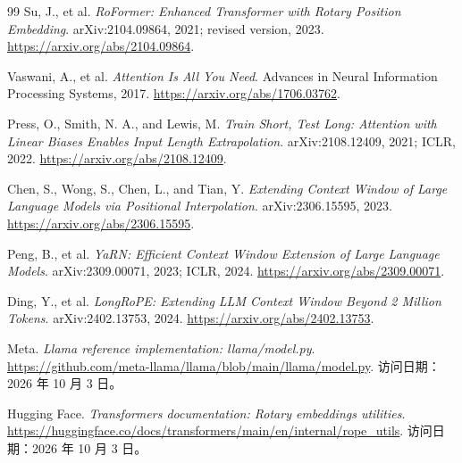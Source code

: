 \documentclass[UTF8,12pt,a4paper,fontset=fandol]{ctexart}
\begin{document}
\begin{thebibliography}{99}
Su, J., et al.
\textit{RoFormer: Enhanced Transformer with Rotary Position Embedding}.
arXiv:2104.09864, 2021; revised version, 2023.
\url{https://arxiv.org/abs/2104.09864}.

Vaswani, A., et al.
\textit{Attention Is All You Need}.
Advances in Neural Information Processing Systems, 2017.
\url{https://arxiv.org/abs/1706.03762}.

Press, O., Smith, N. A., and Lewis, M.
\textit{Train Short, Test Long: Attention with Linear Biases Enables Input Length Extrapolation}.
arXiv:2108.12409, 2021; ICLR, 2022.
\url{https://arxiv.org/abs/2108.12409}.

Chen, S., Wong, S., Chen, L., and Tian, Y.
\textit{Extending Context Window of Large Language Models via Positional Interpolation}.
arXiv:2306.15595, 2023.
\url{https://arxiv.org/abs/2306.15595}.

Peng, B., et al.
\textit{YaRN: Efficient Context Window Extension of Large Language Models}.
arXiv:2309.00071, 2023; ICLR, 2024.
\url{https://arxiv.org/abs/2309.00071}.

Ding, Y., et al.
\textit{LongRoPE: Extending LLM Context Window Beyond 2 Million Tokens}.
arXiv:2402.13753, 2024.
\url{https://arxiv.org/abs/2402.13753}.

Meta.
\textit{Llama reference implementation: llama/model.py}.
\url{https://github.com/meta-llama/llama/blob/main/llama/model.py}.
访问日期：2026 年 10 月 3 日。

Hugging Face.
\textit{Transformers documentation: Rotary embeddings utilities}.
\url{https://huggingface.co/docs/transformers/main/en/internal/rope_utils}.
访问日期：2026 年 10 月 3 日。
\end{thebibliography}
\end{document}
